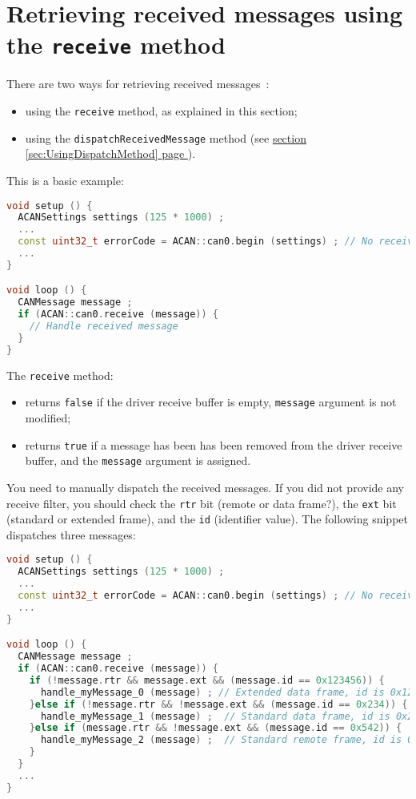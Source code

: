 \documentclass[10pt, a4paper, obeyspaces, openany]{extarticle}
\newcommand \sectionLabel[2]{\section{#1}\label{sec:#2}}
\newcommand\refSectionPage[1]{\hyperref[sec:#1]{section \ref*{sec:#1} page \pageref{sec:#1}}}
\begin{document}
\sectionLabel{Retrieving received messages using the \texttt{receive} method}{UsingReceiveMethod}

There are two ways for retrieving received messages~:
\begin{itemize}
  \item using the \texttt{receive} method, as explained in this section;
  \item using the \texttt{dispatchReceivedMessage} method (see \refSectionPage{UsingDispatchMethod}).
\end{itemize}

This is a basic example:

{ \small\begin{lstlisting}[language=c++]
void setup () {
  ACANSettings settings (125 * 1000) ;
  ...
  const uint32_t errorCode = ACAN::can0.begin (settings) ; // No receive filter
  ...
}

void loop () {
  CANMessage message ;
  if (ACAN::can0.receive (message)) {
    // Handle received message
  }
}
\end{lstlisting}}

The \texttt{receive} method:
\begin{itemize}
  \item returns \texttt{false} if the driver receive buffer is empty, \texttt{message} argument is not modified;
  \item returns \texttt{true} if a message has been has been removed from the driver receive buffer, and the \texttt{message} argument is assigned.
\end{itemize}

You need to manually dispatch the received messages. If you did not provide any receive filter, you should check the \texttt{rtr} bit (remote or data frame?), the \texttt{ext} bit (standard or extended frame), and the \texttt{id} (identifier value). The following snippet dispatches three messages:
{ \small\begin{lstlisting}[language=c++]
void setup () {
  ACANSettings settings (125 * 1000) ;
  ...
  const uint32_t errorCode = ACAN::can0.begin (settings) ; // No receive filter
  ...
}

void loop () {
  CANMessage message ;
  if (ACAN::can0.receive (message)) {
    if (!message.rtr && message.ext && (message.id == 0x123456)) {
      handle_myMessage_0 (message) ; // Extended data frame, id is 0x123456
    }else if (!message.rtr && !message.ext && (message.id == 0x234)) {
      handle_myMessage_1 (message) ;  // Standard data frame, id is 0x234
    }else if (message.rtr && !message.ext && (message.id == 0x542)) {
      handle_myMessage_2 (message) ;  // Standard remote frame, id is 0x542
    }
  }
  ...
}
\end{lstlisting}}
\end{document}
